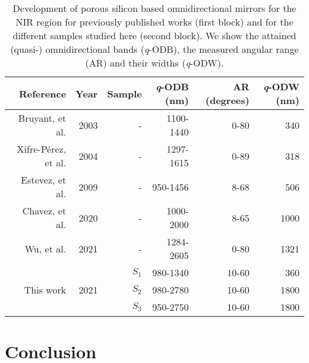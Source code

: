 \documentclass[a4paper,fleqn]{cas-sc}
\newcommand{\hl}[1]{{\color{blue}#1}}
\begin{document}
\begin{table}
        \centering
        \begin{tabular}{rrrrrr}
                Reference&Year&Sample&\emph{q}-ODB (nm)&\hl{AR (degrees)}&\emph{q}-ODW (nm)\\
                \hline
                \hline
                Bruyant, et al. \cite{Bruyant2003}      &2003&-    &1100-1440&\hl{0-80}&340\\
                Xifre-P\'{e}rez, et al. \cite{Xifre2005}&2004&-&1297-1615&\hl{0-89}&318\\
                Estevez, et al. \cite{Estevez2009}      &2009&-    &950-1456&\hl{8-68}&506\\
                Chavez, et al. \cite{Chavez2020}        &2020&-    &1000-2000&\hl{8-65}&1000\\
                Wu, et al. \cite{Wu2021}                &2021&-    &1284-2605&\hl{0-80}&1321\\
                \hline
                &    &$S_1$&980-1340&\hl{10-60}&360 \\
                This work&2021&$S_2$&980-2780&\hl{10-60}&1800\\
                &    &$S_3$&950-2750&\hl{10-60}&1800\\
        \end{tabular}
        \caption{Development of porous silicon based omnidirectional mirrors for the NIR region for
                previously published works (first block) and for the different samples studied here (second
                block). We show the attained (quasi-) omnidirectional
                bands (\emph{q}-ODB), the measured angular range (AR) and their widths (\emph{q}-ODW).}
        \label{tab:table3}
\end{table}


\section{Conclusion}\label{s:conc}
\end{document}
